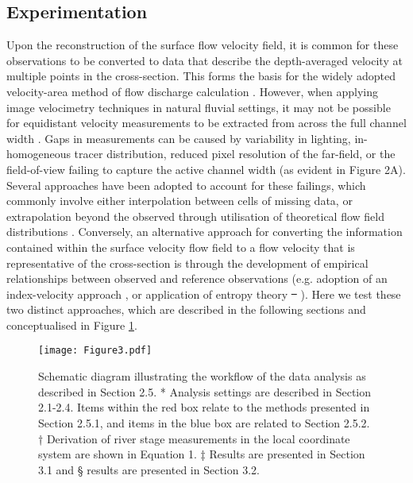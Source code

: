 \documentclass[hess, manuscript]{copernicus} %
\providecommand{\DIFadd}[1]{{\protect\color{blue}\uwave{#1}}} %
\providecommand{\DIFdel}[1]{{\protect\color{red}\sout{#1}}} %
\providecommand{\DIFaddbegin}{} %
\providecommand{\DIFaddend}{} %
\providecommand{\DIFdelbegin}{} %
\providecommand{\DIFdelend}{} %
\providecommand{\DIFaddbeginFL}{} %
\providecommand{\DIFaddendFL}{} %
\providecommand{\DIFdelbeginFL}{} %
\providecommand{\DIFdelendFL}{} %
\newcommand{\DIFscaledelfig}{0.5}
\newlength{\DIFdelgraphicswidth} %
\newlength{\DIFdelgraphicsheight} %
\newcommand{\DIFaddincludegraphics}[2][]{{\color{blue}\fbox{\DIFOincludegraphics[#1]{#2}}}} %
\newcommand{\DIFdelincludegraphics}[2][]{%
\sbox{\DIFdelgraphicsbox}{\DIFOincludegraphics[#1]{#2}}%
\settoboxwidth{\DIFdelgraphicswidth}{\DIFdelgraphicsbox} %
\settoboxtotalheight{\DIFdelgraphicsheight}{\DIFdelgraphicsbox} %
\scalebox{\DIFscaledelfig}{%
\parbox[b]{\DIFdelgraphicswidth}{\usebox{\DIFdelgraphicsbox}\\[-\baselineskip] \rule{\DIFdelgraphicswidth}{0em}}\llap{\resizebox{\DIFdelgraphicswidth}{\DIFdelgraphicsheight}{%
\setlength{\unitlength}{\DIFdelgraphicswidth}%
\begin{picture}(1,1)%
\thicklines\linethickness{2pt} %
{\color[rgb]{1,0,0}\put(0,0){\framebox(1,1){}}}%
{\color[rgb]{1,0,0}\put(0,0){\line( 1,1){1}}}%
{\color[rgb]{1,0,0}\put(0,1){\line(1,-1){1}}}%
\end{picture}%
}\hspace*{3pt}}} %
} %
\DeclareRobustCommand{\DIFaddbegin}{\DIFOaddbegin \let\includegraphics\DIFaddincludegraphics} %
\DeclareRobustCommand{\DIFaddend}{\DIFOaddend \let\includegraphics\DIFOincludegraphics} %
\DeclareRobustCommand{\DIFdelbegin}{\DIFOdelbegin \let\includegraphics\DIFdelincludegraphics} %
\DeclareRobustCommand{\DIFdelend}{\DIFOaddend \let\includegraphics\DIFOincludegraphics} %
\DeclareRobustCommand{\DIFaddbeginFL}{\DIFOaddbeginFL \let\includegraphics\DIFaddincludegraphics} %
\DeclareRobustCommand{\DIFaddendFL}{\DIFOaddendFL \let\includegraphics\DIFOincludegraphics} %
\DeclareRobustCommand{\DIFdelbeginFL}{\DIFOdelbeginFL \let\includegraphics\DIFdelincludegraphics} %
\DeclareRobustCommand{\DIFdelendFL}{\DIFOaddendFL \let\includegraphics\DIFOincludegraphics} %
\begin{document}
\subsection{Experimentation} 
\label{experimentation}
Upon the reconstruction of the surface flow velocity field, it is common for these observations to be converted to data that describe the depth-averaged velocity at multiple points in the cross-section. This forms the basis for the widely adopted velocity-area method of flow discharge calculation \citep{Herschy2014}. However, when applying image velocimetry techniques in natural fluvial settings, it may not be possible for equidistant velocity measurements to be extracted from across the full channel width \citep[e.g.][]{Haro2021,Hutley2023}. Gaps in measurements can be caused by variability in lighting, in-homogeneous tracer distribution, reduced pixel resolution of the far-field, or the field-of-view failing to capture the active channel width (as evident in Figure 2A). Several approaches have been adopted to account for these failings, which commonly involve either interpolation between cells of missing data, or extrapolation beyond the observed through utilisation of theoretical flow field distributions \citep{Leitao2018,LeCoz2010, Fulford1986}. Conversely, an alternative approach for converting the information contained within the surface velocity flow field to a flow velocity that is representative of the cross-section is through the development of empirical relationships between observed and reference observations (e.g. adoption of an index-velocity approach \citep{Levesque2012}, or application of entropy theory \DIFdelbegin \DIFdel{\mbox{%
\citep{Chiu1989, Moramarco2010, vyas2024}}\hskip0pt%
}\DIFdelend \DIFaddbegin \DIFadd{\mbox{%
\citep{Chiu1989, Moramarco2010, Bahmanpouri2022, vyas2024}}\hskip0pt%
}\DIFaddend ). Here we test these two distinct approaches, which are described in the following sections and conceptualised in Figure \ref{Figure3}.

\DIFdelbegin %
\DIFdelendFL %
\DIFaddbeginFL \begin{figure}[!htb]
\DIFaddendFL \centering 
\texttt{[image: Figure3.pdf]}
\caption{Schematic diagram illustrating the workflow of the data analysis as described in Section 2.5. * Analysis settings are described in Section 2.1-2.4. Items within the red box relate to the methods presented in Section 2.5.1, and items in the blue box are related to Section 2.5.2. † Derivation of river stage measurements in the local coordinate system are shown in Equation 1. ‡ Results are presented in Section 3.1 and § results are presented in Section 3.2.}
\label{Figure3} 
\DIFdelbeginFL %
\DIFdelend \DIFaddbegin \end{figure}
\DIFaddend 
\end{document}
